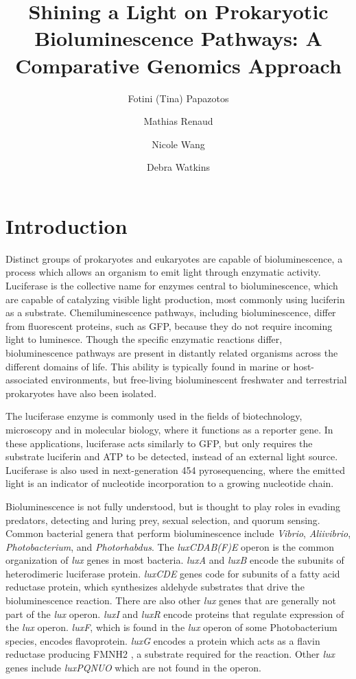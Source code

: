 \documentclass[fleqn,12pt]{wlscirep}
\title{Shining a Light on Prokaryotic Bioluminescence Pathways:
A Comparative Genomics Approach}
\author[1,+]{Fotini (Tina) Papazotos}
\author[1,+]{Mathias Renaud}
\author[1,+]{Nicole Wang}
\author[1,+]{Debra Watkins}
\affil[1]{University of Waterloo, Dept. of Biology, Waterloo, Canada}
\affil[+]{these authors contributed equally to this work}
\begin{document}
\NoHyper
\flushbottom
\maketitle
\doublespace

\section*{Introduction}

Distinct groups of prokaryotes and eukaryotes are capable of bioluminescence, a process which allows an organism to emit light through enzymatic activity\cite{1}. Luciferase is the collective name for enzymes central to bioluminescence, which are capable of catalyzing visible light production, most commonly using luciferin as a substrate\cite{1,2}. Chemiluminescence pathways, including bioluminescence, differ from fluorescent proteins, such as GFP, because they do not require incoming light to luminesce\cite{3}. Though the specific enzymatic reactions differ, bioluminescence pathways are present in distantly related organisms across the different domains of life\cite{4}. This ability is typically found in marine or host-associated environments, but free-living bioluminescent freshwater and terrestrial prokaryotes have also been isolated\cite{4}.

The luciferase enzyme is commonly used in the fields of biotechnology, microscopy and in molecular biology, where it functions as a reporter gene\cite{6}. In these applications, luciferase acts similarly to GFP, but only requires the substrate luciferin and ATP to be detected, instead of an external light source\cite{7}. Luciferase is also used in next-generation 454 pyrosequencing, where the emitted light is an indicator of nucleotide incorporation to a growing nucleotide chain\cite{8}.

Bioluminescence is not fully understood, but is thought to play roles in evading predators, detecting and luring prey, sexual selection, and quorum sensing\cite{5}. Common bacterial genera that perform bioluminescence include \textit{Vibrio}, \textit{Aliivibrio}, \textit{Photobacterium}, and \textit{Photorhabdus}. The \textit{luxCDAB(F)E} operon is the common organization of \textit{lux} genes in most bacteria\cite{9}. \textit{luxA} and \textit{luxB} encode the subunits of heterodimeric luciferase protein\cite{9}. \textit{luxCDE} genes code for subunits of a fatty acid reductase protein, which synthesizes aldehyde substrates that drive the bioluminescence reaction\cite{9}. There are also other \textit{lux} genes that are generally not part of the \textit{lux} operon. \textit{luxI} and \textit{luxR} encode proteins that regulate expression of the \textit{lux} operon\cite{10}. \textit{luxF}, which is found in the \textit{lux} operon of some Photobacterium species, encodes flavoprotein\cite{10}. \textit{luxG} encodes a protein which acts as a flavin reductase producing FMNH2 , a substrate required for the reaction\cite{10}. Other \textit{lux} genes include \textit{luxPQNUO} which are not found in the operon\cite{11}.
\end{document}
